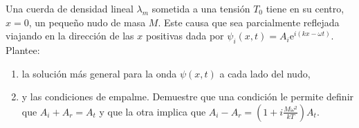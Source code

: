 \item 
Una cuerda de densidad lineal \(\lambda_m\) sometida a una tensión \(T_0\) tiene en su centro,\(x= 0\), un pequeño nudo de masa \(M\).
Este causa que sea parcialmente reflejada viajando en la dirección de las \(x\) positivas dada por \(\psi_i(x,t) = A_i \mathrm{e}^{i ( k x - \omega t ) }\).
Plantee:
\begin{enumerate}
	\item la solución más general para la onda \(\psi (x,t)\) a cada lado del nudo,
	\item y las condiciones de empalme.
	Demuestre que una condición le permite definir que \(A_i + A_r = A_t\) y que la otra implica que \(A_i - A_r = (1 + i \frac{M \omega^2}{k T} )A_t\).
\end{enumerate}
